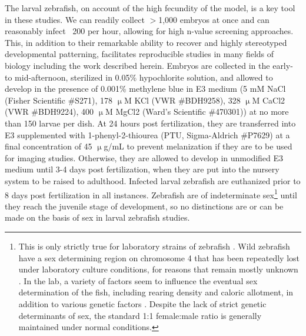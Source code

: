 The larval zebrafish, on account of the high fecundity of the model, is a key tool in these studies. We can readily collect $>$1,000 embryos at once and can reasonably infect ~200 per hour, allowing for high n-value screening approaches. This, in addition to their remarkable ability to recover and highly stereotyped developmental patterning, facilitates reproducible studies in many fields of biology including the work described herein. Embryos are collected in the early- to mid-afternoon, sterilized in 0.05\% hypochlorite solution, and allowed to develop in the presence of 0.001\% methylene blue in E3 medium (5 mM NaCl (Fisher Scientific \#S271), 178 $\upmu$M KCl (VWR \#BDH9258), 328 $\upmu$M CaCl2 (VWR \#BDH9224), 400 $\upmu$M MgCl2 (Ward's Scientific \#470301)) at no more than 150 larvae per dish. At 24 hours post fertilization, they are transferred into E3 supplemented with 1-phenyl-2-thiourea (PTU, Sigma-Aldrich \#P7629) at a final concentration of 45 $\upmu$g/mL to prevent melanization if they are to be used for imaging studies. Otherwise, they are allowed to develop in unmodified E3 medium until 3-4 days post fertilization, when they are put into the nursery system to be raised to adulthood. Infected larval zebrafish are euthanized prior to 8 days post fertilization in all instances. Zebrafish are of indeterminate sex\footnote{This is only strictly true for laboratory strains of zebrafish \citep{Kochakpour2008}. Wild zebrafish have a sex determining region on chromosome 4 that has been repeatedly lost under laboratory culture conditions, for reasons that remain mostly unknown \citep{Howe2013, Parichy2015, Wilson2014}. In the lab, a variety of factors seem to influence the eventual sex determination of the fish, including rearing density and caloric allotment, in addition to various genetic factors \citep{Kossack2019}. Despite the lack of strict genetic determinants of sex, the standard 1:1 female:male ratio is generally maintained under normal conditions.} until they reach the juvenile stage of development, so no distinctions are or can be made on the basis of sex in larval zebrafish studies.

